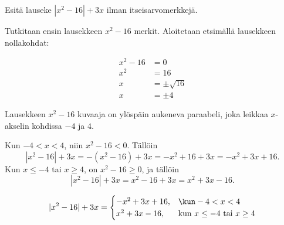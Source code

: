 \begin{esimerkki}
Esitä lauseke $|x^2-16|+3x$ ilman itseisarvomerkkejä.

\begin{esimratk}
Tutkitaan ensin lausekkeen $x^2-16$ merkit. Aloitetaan etsimällä lausekkeen nollakohdat:

\begin{align*}
x^2-16 & =0 \\
x^2 & =16 \\
x & =\pm\sqrt{16} \\
x & =\pm 4
\end{align*}

Lausekkeen $x^2-16$ kuvaaja on ylöspäin aukeneva paraabeli, joka leikkaa $x$-akselin kohdissa $-4$ ja $4$.
	
% 
%


\begin{lukusuora}{-10}{10}{8}
\end{lukusuora}

Kun $-4<x<4$, niin $x^2-16<0$. Tällöin
\[
|x^2-16|+3x = -(x^2-16)+3x = -x^2+16+3x=-x^2+3x+16.
\]
Kun $x\leq-4$ tai $x\geq4$, on $x^2-16\geq0$, ja tällöin
\[
|x^2-16|+3x =x^2-16+3x=x^2+3x-16.
\]
\end{esimratk}

\begin{esimvast}
\[
|x^2-16|+3x=
\begin{cases}
-x^2+3x+16, & \kun -4<x<4 \\
x^2+3x-16, & \text{kun $x\leq -4$ tai $x\geq 4$}
\end{cases}
\]
\end{esimvast}
\end{esimerkki}

